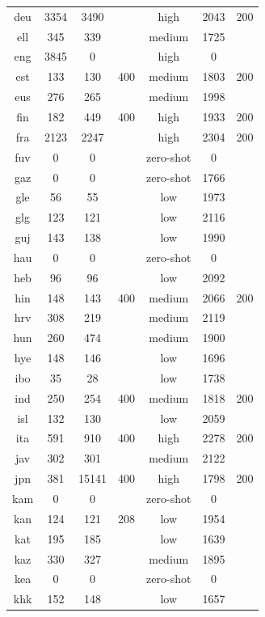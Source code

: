 \begin{table}[!htb]
\begin{minipage}[t]{0.45\textwidth}
\begin{tabular}{@{}ccccccc@{}}
        deu & 3354 & 3490 &  & high & 2043 & 200 \\
        ell & 345 & 339 &  & medium & 1725 &  \\
        eng & 3845 & 0 &  & high & 0 &  \\
        est & 133 & 130 & 400 & medium & 1803 & 200 \\
        eus & 276 & 265 &  & medium & 1998 &  \\
        fin & 182 & 449 & 400 & high & 1933 & 200 \\
        fra & 2123 & 2247 &  & high & 2304 & 200 \\
        fuv & 0 & 0 &  & zero-shot & 0 &  \\
        gaz & 0 & 0 &  & zero-shot & 1766 &  \\
        gle & 56 & 55 &  & low & 1973 &  \\
        glg & 123 & 121 &  & low & 2116 &  \\
        guj & 143 & 138 &  & low & 1990 &  \\
        hau & 0 & 0 &  & zero-shot & 0 &  \\
        heb & 96 & 96 &  & low & 2092 &  \\
        hin & 148 & 143 & 400 & medium & 2066 & 200 \\
        hrv & 308 & 219 &  & medium & 2119 &  \\
        hun & 260 & 474 &  & medium & 1900 &  \\
        hye & 148 & 146 &  & low & 1696 &  \\
        ibo & 35 & 28 &  & low & 1738 &  \\
        ind & 250 & 254 & 400 & medium & 1818 & 200 \\
        isl & 132 & 130 &  & low & 2059 &  \\
        ita & 591 & 910 & 400 & high & 2278 & 200 \\
        jav & 302 & 301 &  & medium & 2122 &  \\
        jpn & 381 & 15141 & 400 & high & 1798 & 200 \\
        kam & 0 & 0 &  & zero-shot & 0 &  \\
        kan & 124 & 121 & 208 & low & 1954 &  \\
        kat & 195 & 185 &  & low & 1639 &  \\
        kaz & 330 & 327 &  & medium & 1895 &  \\
        kea & 0 & 0 &  & zero-shot & 0 &  \\
        khk & 152 & 148 &  & low & 1657 &  \\

\end{tabular}
\end{minipage}
\end{table}
